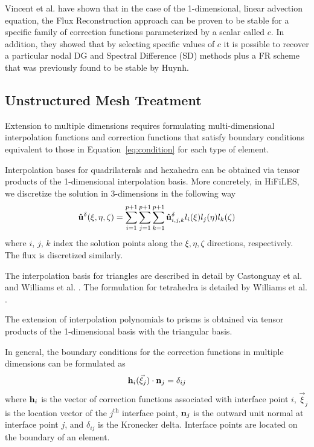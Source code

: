 Vincent et al. \cite{vincent2011new} have shown that in the case of the 1-dimensional, linear advection equation, the Flux Reconstruction approach can be proven to be stable for a specific family of correction functions parameterized by a scalar called $c$. In addition, they showed that by selecting specific values of $c$ it is possible to recover a particular nodal DG and Spectral Difference (SD) methods plus a FR scheme that was previously found to be stable by Huynh\cite{huynh2007flux}.



\subsection{Unstructured Mesh Treatment}
Extension to multiple dimensions requires formulating multi-dimensional interpolation functions and correction functions that satisfy boundary conditions equivalent to those in Equation~\eqref{eq:condition} for each type of element.

Interpolation bases for quadrilaterals and hexahedra can be obtained via tensor products of the 1-dimensional interpolation basis. More concretely, in HiFiLES, we discretize the solution in 3-dimensions in the following way
\begin{equation}
{\bf \hat{u}}^\delta(\xi,\eta,\zeta) = \sum_{i=1}^{p+1} \sum_{j=1}^{p+1} \sum_{k=1}^{p+1}
{\bf \hat{u}}^\delta_{i,j,k} l_i(\xi) l_j(\eta) l_k(\zeta)
\end{equation}
where $i$, $j$, $k$ index the solution points along the $\xi, \eta, \zeta$ directions, respectively. The flux is discretized similarly.

The interpolation basis for triangles are described in detail by Castonguay et al. \cite{castonguay2012new} and Williams et al. \cite{williams2013tri}. The formulation for tetrahedra is detailed by Williams et al. \cite{williams2013tet}.

The extension of interpolation polynomials to prisms is obtained via tensor products of the 1-dimensional basis with the triangular basis\cite{castonguay2011}. 

In general, the boundary conditions for the correction functions in multiple dimensions can be formulated as
\begin{equation}\label{eq:genConstraint}
{\bf h}_i( \vec{\xi}_j)\cdot {\bf n}_j = \delta_{ij}
\end{equation}
where ${\bf h}_i$ is the vector of correction functions associated with interface point $i$, $\vec{\xi}_j$ is the location vector of the $j^\text{th}$ interface point, ${\bf n}_j$ is the outward unit normal at interface point $j$, and $\delta_{ij}$ is the Kronecker delta. Interface points are located on the boundary of an element.

